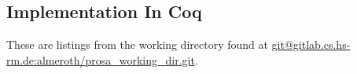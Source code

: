 
\subsection{Implementation In Coq}

These are listings from the working directory found at \url{git@gitlab.cs.hs-rm.de:almeroth/prosa_working_dir.git}.





